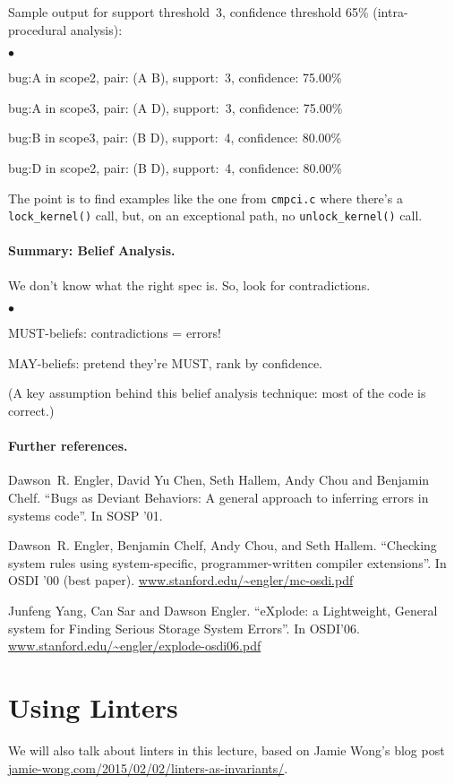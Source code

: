\documentclass[11pt]{article}
\newcommand{\squishlist}{
 \begin{list}{$\bullet$}
  { \setlength{\itemsep}{0pt}
     \setlength{\parsep}{3pt}
     \setlength{\topsep}{3pt}
     \setlength{\partopsep}{0pt}
     \setlength{\leftmargin}{1.5em}
     \setlength{\labelwidth}{1em}
     \setlength{\labelsep}{0.5em} } }
\newcommand{\squishend}{
  \end{list}  }
\begin{document}
Sample output for support threshold~3, confidence threshold 65\% (intra-procedural analysis):
{\small
\squishlist
\item bug:A in scope2, pair: (A B), support:~3, confidence: 75.00\%
\item bug:A in scope3, pair: (A D), support:~3, confidence: 75.00\%
\item bug:B in scope3, pair: (B D), support:~4, confidence: 80.00\%
\item bug:D in scope2, pair: (B D), support:~4, confidence: 80.00\%
\squishend
}

The point is to find examples like the one from {\tt cmpci.c}
where there's a {\tt lock\_kernel()} call, but, on an exceptional path, no
{\tt unlock\_kernel()} call.
\vspace*{-1em}

\paragraph{Summary: Belief Analysis.}
      We don't know what the right spec is.
      So, look for contradictions.

\squishlist
\item      MUST-beliefs: contradictions = errors!
\item      MAY-beliefs: pretend they're MUST, rank by confidence.
\squishend
(A key assumption behind this belief analysis technique: most of the code is correct.)

\paragraph{Further references.}
Dawson~R. Engler, David Yu Chen, Seth Hallem, Andy Chou and Benjamin Chelf.
``Bugs as Deviant Behaviors: A general approach to inferring errors in systems code''.
In SOSP '01.

Dawson~R. Engler, Benjamin Chelf, Andy Chou, and Seth Hallem.
``Checking system rules using system-specific, programmer-written
  compiler extensions''.
In OSDI '00 (best paper).
\url{www.stanford.edu/~engler/mc-osdi.pdf}

Junfeng Yang, Can Sar and Dawson Engler.
``eXplode: a Lightweight, General system for Finding Serious Storage System Errors''.
In OSDI'06.
\url{www.stanford.edu/~engler/explode-osdi06.pdf}

\section*{Using Linters}
We will also talk about linters in this lecture, based on Jamie Wong's blog post \url{jamie-wong.com/2015/02/02/linters-as-invariants/}.
\end{document}
